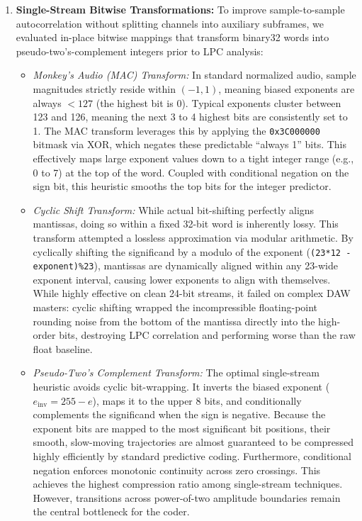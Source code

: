 \documentclass[10pt,twocolumn]{article}
\begin{document}
\begin{enumerate}
	\item \textbf{Single-Stream Bitwise Transformations:} To improve sample-to-sample autocorrelation without splitting channels into auxiliary subframes, we evaluated in-place bitwise mappings that transform binary32 words into pseudo-two's-complement integers prior to LPC analysis:
	      \begin{itemize}
		      \item \textit{Monkey's Audio (MAC) Transform:} In standard normalized audio, sample magnitudes strictly reside within $(-1, 1)$, meaning biased exponents are always $< 127$ (the highest bit is 0). Typical exponents cluster between 123 and 126, meaning the next 3 to 4 highest bits are consistently set to 1. The MAC \cite{MonkeysAudio} transform leverages this by applying the \texttt{0x3C000000} bitmask via XOR, which negates these predictable ``always 1'' bits. This effectively maps large exponent values down to a tight integer range (e.g., 0 to 7) at the top of the word. Coupled with conditional negation on the sign bit, this heuristic smooths the top bits for the integer predictor.
		      \item \textit{Cyclic Shift Transform:} While actual bit-shifting perfectly aligns mantissas, doing so within a fixed 32-bit word is inherently lossy. This transform attempted a lossless approximation via modular arithmetic. By cyclically shifting the significand by a modulo of the exponent (\nolinkurl{(23*12 - exponent)%23}), mantissas are dynamically aligned within any 23-wide exponent interval, causing lower exponents to align with themselves. While highly effective on clean 24-bit streams, it failed on complex DAW masters: cyclic shifting wrapped the incompressible floating-point rounding noise from the bottom of the mantissa directly into the high-order bits, destroying LPC correlation and performing worse than the raw float baseline.
		      \item \textit{Pseudo-Two's Complement Transform:} The optimal single-stream heuristic avoids cyclic bit-wrapping. It inverts the biased exponent ($e_{\text{inv}}=255-e$), maps it to the upper 8 bits, and conditionally complements the significand when the sign is negative. Because the exponent bits are mapped to the most significant bit positions, their smooth, slow-moving trajectories are almost guaranteed to be compressed highly efficiently by standard predictive coding. Furthermore, conditional negation enforces monotonic continuity across zero crossings. This achieves the highest compression ratio among single-stream techniques. However, transitions across power-of-two amplitude boundaries remain the central bottleneck for the coder.
	      \end{itemize}


\end{enumerate}
\end{document}
